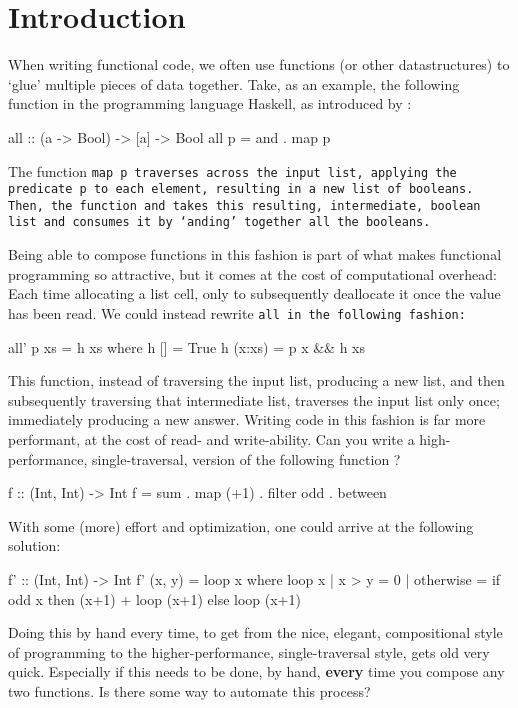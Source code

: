 \section{Introduction}
When writing functional code, we often use functions (or other datastructures) to `glue' multiple pieces of data together.
Take, as an example, the following function in the programming language Haskell, as introduced by \cite{Gill1993}: %
\begin{code}
    all :: (a -> Bool) -> [a] -> Bool
    all p = and . map p
\end{code}
The function \tt{map p} traverses across the input list, applying the predicate \tt{p} to each element, resulting in a new list of booleans. Then, the function \tt{and} takes this resulting, intermediate, boolean list and consumes it by `anding' together all the booleans.

Being able to compose functions in this fashion is part of what makes functional programming so attractive, but it comes at the cost of computational overhead:
Each time allocating a list cell, only to subsequently deallocate it once the value has been read.
We could instead rewrite \tt{all} in the following fashion:
\begin{code}
all' p xs = h xs
      where h []     = True
            h (x:xs) = p x && h xs
\end{code}
This function, instead of traversing the input list, producing a new list, and then subsequently traversing that intermediate list, traverses the input list only once; immediately producing a new answer.
Writing code in this fashion is far more performant, at the cost of read- and write-ability.
Can you write a high-performance, single-traversal, version of the following function \citep{Harper2011}?
\begin{code}
    f :: (Int, Int) -> Int
    f = sum . map (+1) . filter odd . between
\end{code}
With some (more) effort and optimization, one could arrive at the following solution:
\begin{code}
    f' :: (Int, Int) -> Int
    f' (x, y) = loop x
      where loop x | x > y     = 0
                   | otherwise = if odd x
                                 then (x+1) + loop (x+1)
                                 else loop (x+1)
\end{code}
Doing this by hand every time, to get from the nice, elegant, compositional style of programming to the higher-performance, single-traversal style, gets old very quick.
Especially if this needs to be done, by hand, \textbf{every} time you compose any two functions.
Is there some way to automate this process?
